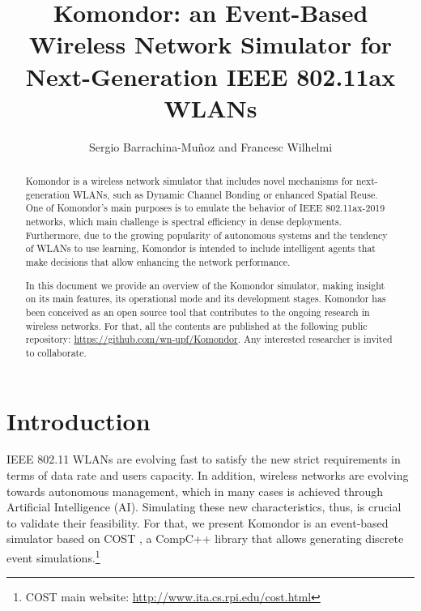 \documentclass[a4paper]{article}
\title{Komondor: an Event-Based Wireless Network Simulator for Next-Generation IEEE 802.11ax WLANs}
\author{Sergio Barrachina-Mu\~noz and Francesc Wilhelmi}
\begin{document}
\maketitle

\begin{abstract}
Komondor is a wireless network simulator that includes novel mechanisms for next-generation WLANs, such as Dynamic Channel Bonding or enhanced Spatial Reuse. One of Komondor's main purposes is to emulate the behavior of IEEE 802.11ax-2019 networks, which main challenge is spectral efficiency in dense deployments. Furthermore, due to the growing popularity of autonomous systems and the tendency of WLANs to use learning, Komondor is intended to include intelligent agents that make decisions that allow enhancing the network performance. 

In this document we provide an overview of the Komondor simulator, making insight on its main features, its operational mode and its development stages. Komondor has been conceived as an open source tool that contributes to the ongoing research in wireless networks. For that, all the contents are published at the following public repository: \url{https://github.com/wn-upf/Komondor}. Any interested researcher is invited to collaborate.
\end{abstract}




\section{Introduction}
\label{section:introduction}

IEEE 802.11 WLANs are evolving fast to satisfy the new strict requirements in terms of data rate and users capacity. In addition, wireless networks are evolving towards autonomous management, which in many cases is achieved through Artificial Intelligence (AI). Simulating these new characteristics, thus, is crucial to validate their feasibility. For that, we present Komondor \cite{barrachina2017komondor} is an event-based simulator based on COST \cite{chen2002reusing}, a CompC++ library that allows generating discrete event simulations.\footnote{COST main website: \url{http://www.ita.cs.rpi.edu/cost.html}} 
	
\end{document}
